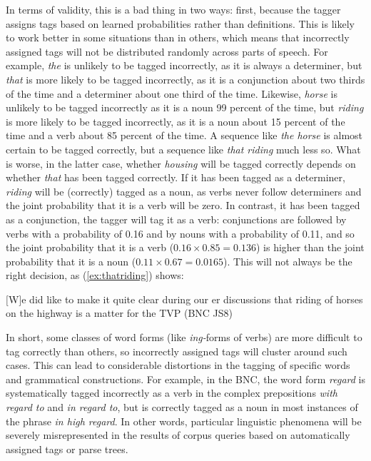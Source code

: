 In terms of validity, this is a bad thing in two ways: first, because the tagger assigns tags based on learned probabilities rather than definitions. This is likely to work better in some situations than in others, which means that incorrectly assigned tags will not be distributed randomly across parts of speech. For example, \textit{the} is unlikely to be tagged incorrectly, as it is always a determiner, but \textit{that} is more likely to be tagged incorrectly, as it is a conjunction about two thirds of the time and a determiner about one third of the time. Likewise, \textit{horse} is unlikely to be tagged incorrectly as it is a noun 99 percent of the time, but \textit{riding} is more likely to be tagged incorrectly, as it is a noun about 15 percent of the time and a verb about 85 percent of the time. A sequence like \textit{the horse} is almost certain to be tagged correctly, but a sequence like \textit{that riding} much less so. What is worse, in the latter case, whether \textit{housing} will be tagged correctly depends on whether \textit{that} has been tagged correctly. If it has been tagged as a determiner, \textit{riding} will be (correctly) tagged as a noun, as verbs never follow determiners and the joint probability that it is a verb will be zero. In contrast, it has been tagged as a conjunction, the tagger will tag it as a verb: conjunctions are followed by verbs with a probability of 0.16 and by nouns with a probability of 0.11, and so the joint probability that it is a verb ($0.16 \times 0.85 = 0.136$) is higher than the joint probability that it is a noun ($0.11 \times 0.67 = 0.0165$). This will not always be the right decision, as (\ref{ex:thatriding}) shows:

\begin{exe}
\ex  $[$W$]$e did like to make it quite clear during our er discussions that riding of horses on the highway is a matter for the TVP (BNC JS8)
\label{ex:thatriding}
\end{exe}

In short, some classes of word forms (like \textit{ing-}forms of verbs) are more difficult to tag correctly than others, so incorrectly assigned tags will cluster around such cases. This can lead to considerable distortions in the tagging of specific words and grammatical constructions. For example, in the BNC, the word form \textit{regard} is systematically tagged incorrectly as a verb in the complex prepositions \textit{with regard to} and \textit{in regard to}, but is correctly tagged as a noun in most instances of the phrase \textit{in high regard}. In other words, particular linguistic phenomena will be severely misrepresented in the results of corpus queries based on automatically assigned tags or parse trees.

